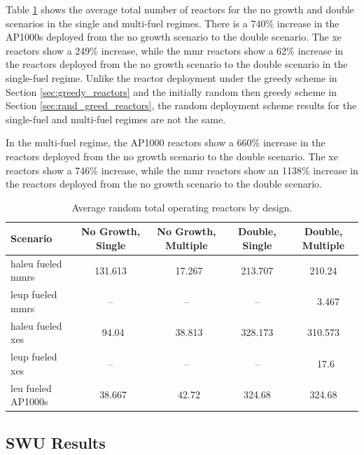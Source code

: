 Table \ref{tab:random_reac_avg} shows the average total number of reactors for the no growth and double scenarios in the single and multi-fuel regimes. There is a 740\% increase in the AP1000s deployed from the no growth scenario to the double scenario. The \gls{xe} reactors show a 249\% increase, while the \gls{mmr} reactors show a 62\% increase in the reactors deployed from the no growth scenario to the double scenario in the single-fuel regime. Unlike the reactor deployment under the greedy scheme in Section \ref{sec:greedy_reactors} and the initially random then greedy scheme in Section \ref{sec:rand_greed_reactors}, the random deployment scheme results for the single-fuel and multi-fuel regimes are not the same.

In the multi-fuel regime, the AP1000 reactors show a 660\% increase in the reactors deployed from the no growth scenario to the double scenario. The \gls{xe} reactors show a 746\% increase, while the \gls{mmr} reactors show an 1138\% increase in the reactors deployed from the no growth scenario to the double scenario.

\begin{table}[H]
    \centering
    \caption{Average random total operating reactors by design.}
    \label{tab:random_reac_avg}
    \begin{tabular}{l c c c c}
       \hline
       Scenario & No Growth, Single & No Growth, Multiple & Double, Single & Double, Multiple  \\
       \hline
       \gls{haleu} fueled \glspl{mmr} & 131.613 & \textcolor{white}{0}17.267  & 213.707 & 210.24  \\
       \gls{leup} fueled \glspl{mmr}  & --      & --      & --      & \textcolor{white}{00}3.467   \\
       \gls{haleu} fueled \glspl{xe}  & \textcolor{white}{0}94.04   & \textcolor{white}{0}38.813  & 328.173 & 310.573 \\
       \gls{leup} fueled \glspl{xe}   & --      & --      & --      & \textcolor{white}{0}17.6    \\
       \gls{leu} fueled AP1000s       & \textcolor{white}{0}38.667  & \textcolor{white}{0}42.72   & 324.68  & 324.68  \\
       \hline
    \end{tabular}
\end{table}




\subsection{SWU Results}
\label{sec:random_swu}

